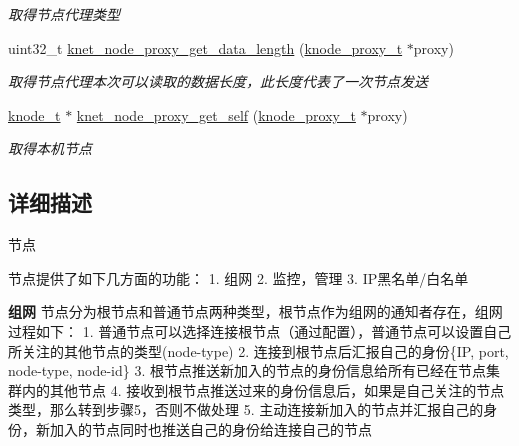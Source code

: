 \begin{DoxyCompactItemize}
\begin{DoxyCompactList}\small\item\em 取得节点代理类型 \end{DoxyCompactList}\item 
uint32\+\_\+t \hyperlink{a00135_gaaa6781024365a8c19e4113b5a1c5a291_gaaa6781024365a8c19e4113b5a1c5a291}{knet\+\_\+node\+\_\+proxy\+\_\+get\+\_\+data\+\_\+length} (\hyperlink{a00066_a5025c3e4422f5f55b981aad6e56b6d89_a5025c3e4422f5f55b981aad6e56b6d89}{knode\+\_\+proxy\+\_\+t} $\ast$proxy)
\begin{DoxyCompactList}\small\item\em 取得节点代理本次可以读取的数据长度，此长度代表了一次节点发送 \end{DoxyCompactList}\item 
\hyperlink{a00066_a5e720b27efbc9ad744240f5f4233763a_a5e720b27efbc9ad744240f5f4233763a}{knode\+\_\+t} $\ast$ \hyperlink{a00135_ga1cc9cde586994397081f6e28f8c40ace_ga1cc9cde586994397081f6e28f8c40ace}{knet\+\_\+node\+\_\+proxy\+\_\+get\+\_\+self} (\hyperlink{a00066_a5025c3e4422f5f55b981aad6e56b6d89_a5025c3e4422f5f55b981aad6e56b6d89}{knode\+\_\+proxy\+\_\+t} $\ast$proxy)
\begin{DoxyCompactList}\small\item\em 取得本机节点 \end{DoxyCompactList}\end{DoxyCompactItemize}


\subsection{详细描述}
节点 


\begin{DoxyPre}
节点提供了如下几方面的功能：
1. 组网
2. 监控，管理
3. IP黑名单/白名单\end{DoxyPre}



\begin{DoxyPre}{\bfseries 组网}
节点分为根节点和普通节点两种类型，根节点作为组网的通知者存在，组网过程如下：
1. 普通节点可以选择连接根节点（通过配置），普通节点可以设置自己所关注的其他节点的类型(node-type)
2. 连接到根节点后汇报自己的身份\{IP, port, node-type, node-id\}
3. 根节点推送新加入的节点的身份信息给所有已经在节点集群内的其他节点
4. 接收到根节点推送过来的身份信息后，如果是自己关注的节点类型，那么转到步骤5，否则不做处理
5. 主动连接新加入的节点并汇报自己的身份，新加入的节点同时也推送自己的身份给连接自己的节点\end{DoxyPre}



